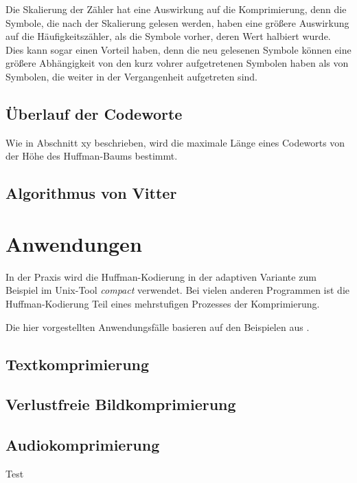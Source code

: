 \documentclass[twoside,11pt,a4paper]{article}
\theoremstyle{break}
\begin{document}

Die Skalierung der Zähler hat eine Auswirkung auf die Komprimierung, denn die
Symbole, die nach der Skalierung gelesen werden, haben eine größere Auswirkung
auf die Häufigkeitszähler, als die Symbole vorher, deren Wert halbiert wurde.
Dies kann sogar einen Vorteil haben, denn die neu gelesenen Symbole können eine
größere Abhängigkeit von den kurz vohrer aufgetretenen Symbolen haben als von
Symbolen, die weiter in der Vergangenheit aufgetreten sind.

\subsection{Überlauf der Codeworte}

Wie in Abschnitt xy beschrieben, wird die maximale Länge eines Codeworts
von der Höhe des Huffman-Baums bestimmt.


\subsection{Algorithmus von Vitter}

\section{Anwendungen}

In der Praxis wird die Huffman-Kodierung in der adaptiven Variante zum Beispiel
im Unix-Tool \emph{compact} verwendet. Bei vielen anderen Programmen ist die
Huffman-Kodierung Teil eines mehrstufigen Prozesses der Komprimierung.


Die hier vorgestellten Anwendungsfälle basieren auf den Beispielen aus
\cite{Sayood:2006}.

\subsection{Textkomprimierung}

\subsection{Verlustfreie Bildkomprimierung}

\subsection{Audiokomprimierung}


Test \cite{Salomon:2010}  \cite{Williams:1991}



\end{document}
